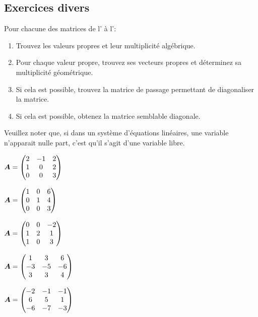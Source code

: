 \begin{TwoCol}
\section{Exercices divers}
Pour chacune des matrices de l' à 
l':
\begin{enumerate}
\item Trouvez les valeurs propres et leur multiplicité algébrique.
\item Pour chaque valeur propre, trouvez ses vecteurs propres et déterminez
sa multiplicité géométrique.
\item Si cela est possible, trouvez la matrice de passage permettant de diagonaliser
la matrice.
\item Si cela est possible, obtenez la matrice semblable diagonale.
\end{enumerate}
Veuillez noter que, si dans un système d'équations linéaires, une variable
n'apparait nulle part, c'est qu'il s'agit d'une variable libre.

\begin{exercice}\label{ex:propre-premier}
$\displaystyle
\boldsymbol{A} = \begin{pmatrix}
2 & -1 & 2 \\
1 & 0 & 2 \\
0 & 0 & 3
\end{pmatrix}
$
\end{exercice}
\begin{exercice}
$\displaystyle
\boldsymbol{A} = \begin{pmatrix}
1 & 0 & 6 \\
0 & 1 & 4 \\
0 & 0 & 3
\end{pmatrix}
$
\end{exercice}
\begin{exercice}
$\displaystyle
\boldsymbol{A} = \begin{pmatrix}
0 & 0 & -2 \\
1 & 2 & 1 \\
1 & 0 & 3
\end{pmatrix}
$
\end{exercice}
\begin{exercice}
$\displaystyle
\boldsymbol{A} = \begin{pmatrix}
1 & 3 & 6 \\
-3 & -5 & -6 \\
3 & 3 & 4
\end{pmatrix}
$
\end{exercice}
\begin{exercice}\label{ex:propre-dernier}
$\displaystyle
\boldsymbol{A} = \begin{pmatrix}
-2 & -1 & -1 \\
6 & 5 & 1 \\
-6 & -7 & -3
\end{pmatrix}
$
\end{exercice}
\end{TwoCol}